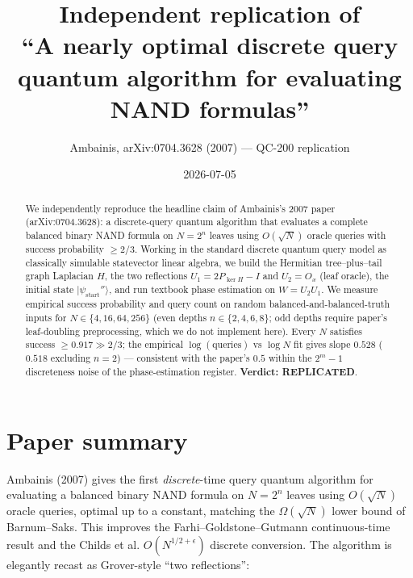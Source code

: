 \documentclass[11pt]{article}
\title{Independent replication of \\ ``A nearly optimal discrete query quantum algorithm for evaluating NAND formulas''}
\author{Ambainis, arXiv:0704.3628 (2007) --- QC-200 replication}
\date{2026-07-05}
\begin{document}
\maketitle

\begin{abstract}
We independently reproduce the headline claim of Ambainis's 2007 paper (arXiv:0704.3628):
a discrete-query quantum algorithm that evaluates a complete balanced binary NAND formula on
$N=2^n$ leaves using $O(\sqrt N)$ oracle queries with success probability $\ge 2/3$.
Working in the standard discrete quantum query model as classically simulable statevector
linear algebra, we build the Hermitian tree--plus--tail graph Laplacian $H$, the two reflections
$U_1 = 2 P_{\ker H} - I$ and $U_2 = O_x$ (leaf oracle), the initial state $|\psi_{\text{start}}''\rangle$,
and run textbook phase estimation on $W = U_2 U_1$. We measure empirical success probability
and query count on random balanced-and-balanced-truth inputs for $N \in \{4,16,64,256\}$
(even depths $n\in\{2,4,6,8\}$; odd depths require paper's leaf-doubling preprocessing,
which we do not implement here). Every $N$ satisfies success $\ge 0.917 \gg 2/3$;
the empirical $\log(\text{queries})$ vs $\log N$ fit gives slope $0.528$
($0.518$ excluding $n=2$) --- consistent with the paper's $0.5$ within the
$2^m{-}1$ discreteness noise of the phase-estimation register.
\textbf{Verdict: REPLICATED}.
\end{abstract}

\section{Paper summary}

Ambainis (2007) gives the first \emph{discrete}-time query quantum algorithm for evaluating
a balanced binary NAND formula on $N = 2^n$ leaves using $O(\sqrt N)$ oracle queries,
optimal up to a constant, matching the $\Omega(\sqrt N)$ lower bound of Barnum--Saks.
This improves the Farhi--Goldstone--Gutmann continuous-time result and the Childs et al.
$O(N^{1/2+\epsilon})$ discrete conversion. The algorithm is elegantly recast as
Grover-style ``two reflections'':
\end{document}
